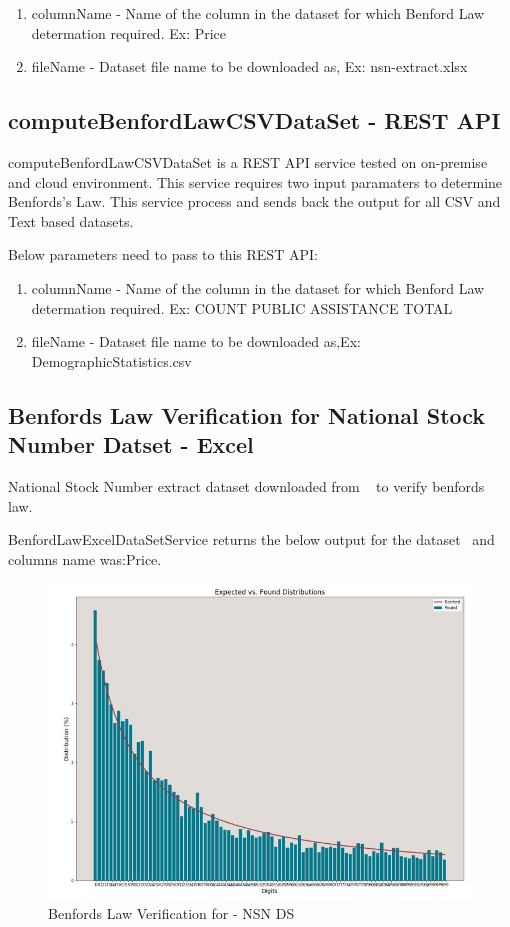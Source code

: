 \begin{enumerate}
\item columnName - Name of the column in the 
 dataset for which Benford Law determation required. 
 Ex: Price
\item fileName - Dataset file name to be downloaded 
 as, Ex: nsn-extract.xlsx
\end{enumerate}

\subsection{computeBenfordLawCSVDataSet - REST API}
computeBenfordLawCSVDataSet is a REST API service 
tested on on-premise and cloud environment. 
This service requires two input paramaters to 
determine Benfords's Law. This service
process and sends back the output 
for all CSV and Text based datasets.

Below parameters need to pass to this REST API:

\begin{enumerate}
\item columnName - Name of the column in the 
 dataset for which Benford Law determation required. 
 Ex: COUNT PUBLIC ASSISTANCE TOTAL
\item fileName - Dataset file name to be downloaded 
 as,Ex: DemographicStatistics.csv
\end{enumerate}

\subsection{Benfords Law Verification for National Stock 
Number Datset - Excel}
National Stock Number extract dataset downloaded from 
~\cite{hid-sp18-514-nsn-ds-desc} to verify benfords law.

BenfordLawExcelDataSetService returns the below
output for the dataset~\cite{hid-sp18-514-excelDatalocation}
and columns name was:Price.

\begin{figure}[!ht]
\centering\includegraphics[width=\columnwidth]{images/benford_nsn.JPG}
  \caption{Benfords Law Verification for - NSN DS}\label{f:NSN-ds-benfordlaw}
\end{figure}

